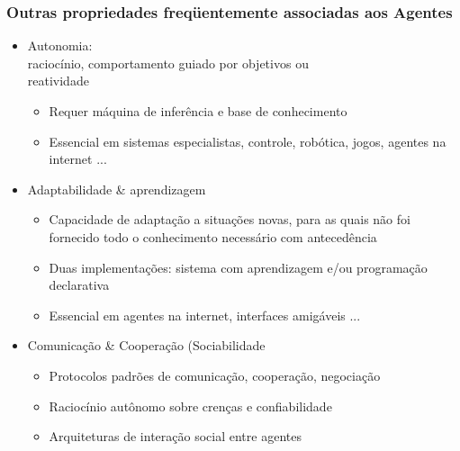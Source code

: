\begin{frame} [allowframebreaks=0.9]

    \frametitle{Outras propriedades freqüentemente 
associadas aos Agentes}


  
    \begin{itemize}
      \item Autonomia:\\
raciocínio, comportamento guiado por objetivos ou \\
reatividade

\begin{itemize}
  \item Requer máquina de inferência e base de conhecimento
  \item Essencial em sistemas especialistas, controle, robótica, jogos, agentes na internet ...
\end{itemize}
      
    \item Adaptabilidade \& aprendizagem
             
    \begin{itemize}
             
    \item Capacidade de adaptação a situações novas, para as quais não foi fornecido todo o      conhecimento necessário com antecedência 

     \item Duas implementações: sistema com  
           aprendizagem 
           e/ou programação declarativa
  
     \item Essencial em agentes na internet, interfaces amigáveis ...
   
    \end{itemize}
             
             
    \item Comunicação \& Cooperação (Sociabilidade
         \begin{itemize}
          \item  Protocolos padrões de comunicação, cooperação, negociação
          \item  Raciocínio autônomo sobre crenças e confiabilidade
          \item   Arquiteturas de interação social entre agentes
                      
         \end{itemize}
         

\end{itemize}
\end{frame}
